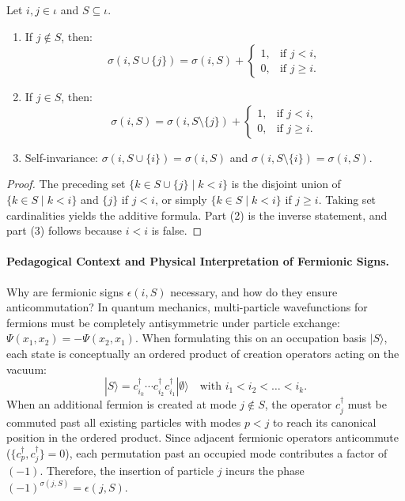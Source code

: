 \begin{lemma}
\label{lem:atomic_counts}
Let $i, j \in \iota$ and $S \subseteq \iota$.
\begin{enumerate}
    \item If $j \notin S$, then:
    \begin{equation}
    \sigma(i, S \cup \{j\}) = \sigma(i, S) + \begin{cases} 1, & \text{if } j < i, \\ 0, & \text{if } j \ge i. \end{cases}
    \end{equation}
    \item If $j \in S$, then:
    \begin{equation}
    \sigma(i, S) = \sigma(i, S \setminus \{j\}) + \begin{cases} 1, & \text{if } j < i, \\ 0, & \text{if } j \ge i. \end{cases}
    \end{equation}
    \item Self-invariance: $\sigma(i, S \cup \{i\}) = \sigma(i, S)$ and $\sigma(i, S \setminus \{i\}) = \sigma(i, S)$.
\end{enumerate}
\end{lemma}

\begin{proof}
The preceding set $\{k \in S \cup \{j\} \mid k < i\}$ is the disjoint union of $\{k \in S \mid k < i\}$ and $\{j\}$ if $j < i$, or simply $\{k \in S \mid k < i\}$ if $j \ge i$. Taking set cardinalities yields the additive formula. Part (2) is the inverse statement, and part (3) follows because $i < i$ is false.
\end{proof}

\paragraph{Pedagogical Context and Physical Interpretation of Fermionic Signs.}
Why are fermionic signs $\epsilon(i, S)$ necessary, and how do they ensure anticommutation?
In quantum mechanics, multi-particle wavefunctions for fermions must be completely antisymmetric under particle exchange: $\Psi(x_1, x_2) = - \Psi(x_2, x_1)$. When formulating this on an occupation basis $|S\rangle$, each state is conceptually an ordered product of creation operators acting on the vacuum:
\begin{equation}
|S\rangle = c_{i_k}^\dagger \cdots c_{i_2}^\dagger c_{i_1}^\dagger |\emptyset\rangle \quad \text{with } i_1 < i_2 < \dots < i_k.
\end{equation}
When an additional fermion is created at mode $j \notin S$, the operator $c_j^\dagger$ must be commuted past all existing particles with modes $p < j$ to reach its canonical position in the ordered product. Since adjacent fermionic operators anticommute ($\{c_p^\dagger, c_j^\dagger\} = 0$), each permutation past an occupied mode contributes a factor of $(-1)$. Therefore, the insertion of particle $j$ incurs the phase $(-1)^{\sigma(j, S)} = \epsilon(j, S)$.

